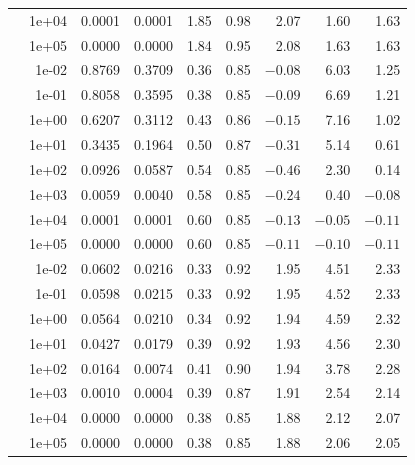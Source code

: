 \begin{table}[htbp]
\begin{tabular}{rrrrrrrrr}
 & 1e+04 & 0.0001 & 0.0001 & 1.85 & 0.98 & 2.07 & 1.60 & 1.63 \\
 & 1e+05 & 0.0000 & 0.0000 & 1.84 & 0.95 & 2.08 & 1.63 & 1.63 \\
\addlinespace
1.0 & 1e-02 & 0.8769 & 0.3709 & 0.36 & 0.85 & $-0.08$ & 6.03 & 1.25 \\
 & 1e-01 & 0.8058 & 0.3595 & 0.38 & 0.85 & $-0.09$ & 6.69 & 1.21 \\
 & 1e+00 & 0.6207 & 0.3112 & 0.43 & 0.86 & $-0.15$ & 7.16 & 1.02 \\
 & 1e+01 & 0.3435 & 0.1964 & 0.50 & 0.87 & $-0.31$ & 5.14 & 0.61 \\
 & 1e+02 & 0.0926 & 0.0587 & 0.54 & 0.85 & $-0.46$ & 2.30 & 0.14 \\
 & 1e+03 & 0.0059 & 0.0040 & 0.58 & 0.85 & $-0.24$ & 0.40 & $-0.08$ \\
 & 1e+04 & 0.0001 & 0.0001 & 0.60 & 0.85 & $-0.13$ & $-0.05$ & $-0.11$ \\
 & 1e+05 & 0.0000 & 0.0000 & 0.60 & 0.85 & $-0.11$ & $-0.10$ & $-0.11$ \\
\addlinespace
3.0 & 1e-02 & 0.0602 & 0.0216 & 0.33 & 0.92 & 1.95 & 4.51 & 2.33 \\
 & 1e-01 & 0.0598 & 0.0215 & 0.33 & 0.92 & 1.95 & 4.52 & 2.33 \\
 & 1e+00 & 0.0564 & 0.0210 & 0.34 & 0.92 & 1.94 & 4.59 & 2.32 \\
 & 1e+01 & 0.0427 & 0.0179 & 0.39 & 0.92 & 1.93 & 4.56 & 2.30 \\
 & 1e+02 & 0.0164 & 0.0074 & 0.41 & 0.90 & 1.94 & 3.78 & 2.28 \\
 & 1e+03 & 0.0010 & 0.0004 & 0.39 & 0.87 & 1.91 & 2.54 & 2.14 \\
 & 1e+04 & 0.0000 & 0.0000 & 0.38 & 0.85 & 1.88 & 2.12 & 2.07 \\
 & 1e+05 & 0.0000 & 0.0000 & 0.38 & 0.85 & 1.88 & 2.06 & 2.05 \\
\bottomrule
\end{tabular}
\end{table}
